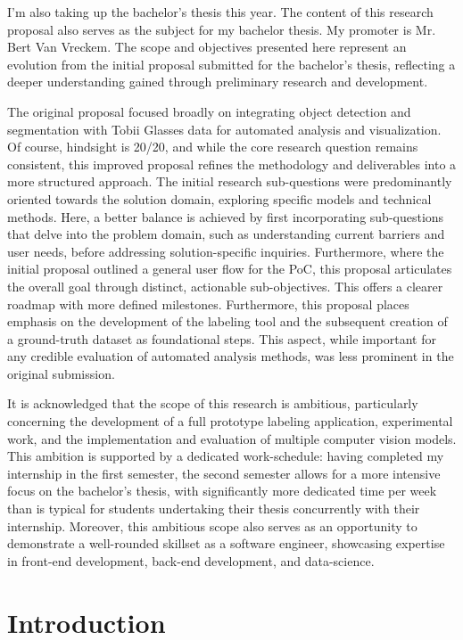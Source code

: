 \documentclass[english]{hogent-article}
\begin{document}
I'm also taking up the bachelor's thesis this year. The content of this research proposal also serves as the subject for my bachelor thesis. 
My promoter is Mr. Bert Van Vreckem. The scope and objectives presented here represent an evolution from the initial proposal submitted 
for the bachelor's thesis, reflecting a deeper understanding gained through preliminary research and development.

The original proposal focused broadly on integrating object detection and segmentation with Tobii Glasses data for automated analysis and visualization.
Of course, hindsight is 20/20, and while the core research question remains consistent, this improved proposal refines the 
methodology and deliverables into a more structured approach. 
The initial research sub-questions were predominantly oriented towards the solution domain, exploring specific models and technical methods.
Here, a better balance is achieved by first incorporating sub-questions that delve into the problem domain, such as understanding current barriers and user needs, before addressing solution-specific inquiries.
Furthermore, where the initial proposal outlined a general user flow for the PoC, 
this proposal articulates the overall goal through distinct, actionable sub-objectives.
This offers a clearer roadmap with more defined milestones.
Furthermore, this proposal places emphasis on the development of the labeling tool and the subsequent creation of a ground-truth dataset as foundational steps.
This aspect, while important for any credible evaluation of automated analysis methods, was less prominent in the original submission.

It is acknowledged that the scope of this research is ambitious, particularly concerning the development of a 
full prototype labeling application, experimental work, and the implementation and evaluation of multiple computer vision models.
This ambition is supported by a dedicated work-schedule: having completed my internship in the first semester, the second semester allows for a more intensive focus
on the bachelor's thesis, with significantly more dedicated time per week than is typical for students undertaking their thesis concurrently with their internship.
Moreover, this ambitious scope also serves as an opportunity to demonstrate a well-rounded skillset as a software engineer, showcasing expertise in front-end development, back-end development, and data-science.

\section{Introduction}
\label{sec:Introduction}
\end{document}
